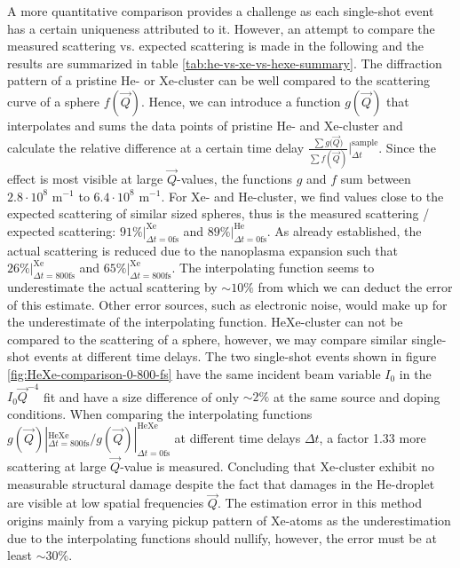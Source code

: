 A more quantitative comparison provides a challenge as each single-shot event has a certain uniqueness attributed to it. However, an attempt to compare the measured scattering vs. expected scattering is made in the following and the results are summarized in table \ref{tab:he-vs-xe-vs-hexe-summary}. The diffraction pattern of a pristine He- or Xe-cluster can be well compared to the scattering curve of a sphere $f(\vec{Q})$. Hence, we can introduce a function $g(\vec{Q})$ that interpolates and sums the data points of pristine He- and Xe-cluster and calculate the relative difference at a certain time delay $\tfrac{\sum{g(\vec{Q}})}{\sum{f(\vec{Q})}}|_{\Delta t}^{\text{sample}}$. Since the effect is most visible at large $\vec{Q}$-values, the functions $g$ and $f$ sum between $2.8\cdot 10^{8}$ m$^{-1}$ to $6.4\cdot 10^{8}$ m$^{-1}$. For Xe- and He-cluster, we find values close to the expected scattering of similar sized spheres, thus is the measured scattering / expected scattering: $91 \% |_{\Delta t = 0 \text{fs}}^{\text{Xe}}$ and $89 \%|_{\Delta t=0 \text{fs}}^{\text{He}}$. As already established, the actual scattering is reduced due to the nanoplasma expansion such that $26 \% |_{\Delta t = 800 \text{fs}}^{\text{Xe}}$ and $65 \% |_{\Delta t = 800 \text{fs}}^{\text{Xe}}$. The interpolating function seems to underestimate the actual scattering by $\sim 10\%$ from which we can deduct the error of this estimate. Other error sources, such as electronic noise, would make up for the underestimate of the interpolating function. HeXe-cluster can not be compared to the scattering of a sphere, however, we may compare similar single-shot events at different time delays. The two single-shot events shown in figure \ref{fig:HeXe-comparison-0-800-fs} have the same incident beam variable $I_{0}$ in the $I_{0} \vec{Q}^{-4}$ fit and have a size difference of only $\sim 2\%$ at the same source and doping conditions. When comparing the interpolating functions $g(\vec{Q}) |_{\Delta t = 800 \text{fs}}^{\text{HeXe}}/g(\vec{Q}) |_{\Delta t = 0 \text{fs}}^{\text{HeXe}}$ at different time delays $\Delta t$, a factor 1.33 more scattering at large $\vec{Q}$-value is measured. Concluding that Xe-cluster exhibit no measurable structural damage despite the fact that damages in the He-droplet are visible at low spatial frequencies $\vec{Q}$. The estimation error in this method origins mainly from a varying pickup pattern of Xe-atoms as the underestimation due to the interpolating functions should nullify, however, the error must be at least $\sim 30 \%$.\\

